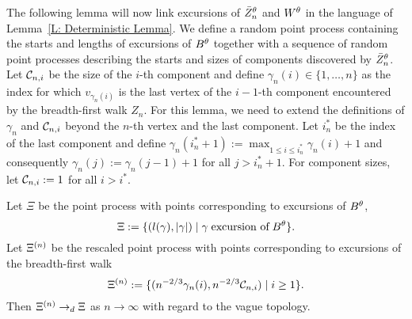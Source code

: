 The following lemma will now link excursions of $\bar{Z}^{\theta}_n$ and $W^{\theta}$ in the language of Lemma~\ref{L: Deterministic Lemma}.
We define a random point process containing the starts and lengths of excursions of $B^{\theta}$ together with a sequence of random point processes describing the starts and sizes of components discovered by $\bar{Z}^{\theta}_n$.
Let $\mathcal{C}_{n,i}$ be the size of the $i$-th component and
define $\gamma_n(i) \in \{1, \dots, n\}$ as the index for which
$v_{\gamma_n(i)}$ is the last vertex of the $i-1$-th component encountered by the breadth-first walk $Z_n$.
For this lemma, we need to extend the definitions of $\gamma_n$ and $\mathcal{C}_{n,i}$ beyond the $n$-th vertex and the last component.
Let $i^*_n$ be the index of the last component 
and define $\gamma_n(i^*_n + 1) := \max_{1 \leq i \leq i^*_n}\gamma_n(i) + 1$ 
and consequently $\gamma_n(j) := \gamma_n(j-1) + 1$ for all $j > i^*_n + 1$.
For component sizes, let $\mathcal{C}_{n,i} := 1$ for all $i > i^*$.


\begin{lemma} \label{L: Lemma 8}
	Let $\Xi$ be the point process with points corresponding to excursions of $B^{\theta}$,
	\begin{equation} \label{E: Lemma 8 def Xi}
	\Xi := \{ (l(\gamma), |\gamma|) \; | \; \gamma \; \text{excursion of} \; B^{\theta} \}.
	\end{equation}
	Let $\Xi^{(n)}$ be the rescaled point process with points corresponding to excursions of the breadth-first walk
	\begin{equation} \label{E: Lemma 8 def Xin}
	\Xi^{(n)} := \{ ( n^{-2 / 3} \gamma_n(i), n^{-2 / 3} \mathcal{C}_{n,i} ) \; | \; i \geq 1 \}.
	\end{equation}
	Then $\Xi^{(n)} \rightarrow_d \Xi$ as $n \rightarrow \infty$ with regard to the vague topology.
\end{lemma}

